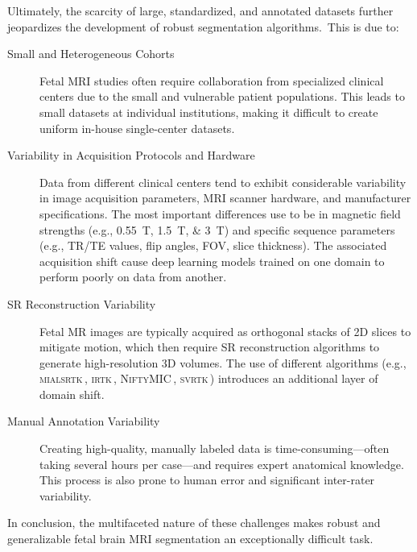 Ultimately, the scarcity of large, standardized, and annotated datasets further jeopardizes the development of robust segmentation algorithms.\,\cite{FeTA2024_paper,FeTA2021_review, Ciceri2023} This is due to:
\begin{description}
    \item[Small and Heterogeneous Cohorts] Fetal MRI studies often require collaboration from specialized clinical centers due to the small and vulnerable patient populations. This leads to small datasets at individual institutions, making it difficult to create uniform in-house single-center datasets.
    \item[Variability in Acquisition Protocols and Hardware] Data from different clinical centers tend to exhibit considerable variability in image acquisition parameters, MRI scanner hardware, and manufacturer specifications. The most important differences use to be in magnetic field strengths (e.g., \qtylist{0.55;1.5;3}{\tesla}) and specific sequence parameters (e.g., TR/TE values, flip angles, FOV, slice thickness). The associated acquisition shift cause deep learning models trained on one domain to perform poorly on data from another.
    \item[SR Reconstruction Variability] Fetal MR images are typically acquired as orthogonal stacks of 2D slices to mitigate motion, which then require SR reconstruction algorithms to generate high-resolution 3D volumes. The use of different algorithms (e.g., \textsc{mialsrtk}\,\cite{Tourbier2015, MIALSRTK}, \textsc{irtk}\,\cite{Kuklisova2012, irtk-simple}, \textsc{NiftyMIC}\,\cite{Ebner2020}, \textsc{svrtk}\,\cite{Uus2022}) introduces an additional layer of domain shift.
    \item[Manual Annotation Variability] Creating high-quality, manually labeled data is time-consuming---often taking several hours per case---and requires expert anatomical knowledge. This process is also prone to human error and significant inter-rater variability.
\end{description}

In conclusion, the multifaceted nature of these challenges makes robust and generalizable fetal brain MRI segmentation an exceptionally difficult task.
